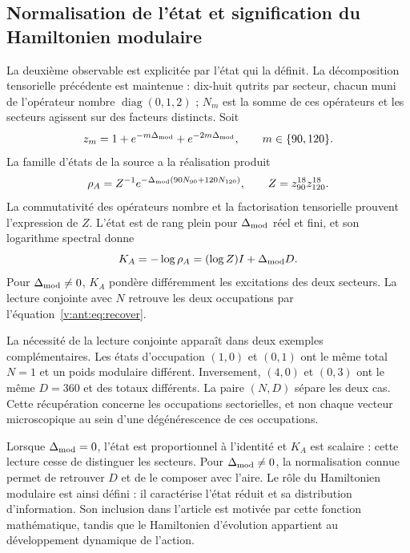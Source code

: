 \subsection{Normalisation de l'état et signification du Hamiltonien modulaire}
La deuxième observable est explicitée par l'état qui la définit.
La décomposition tensorielle précédente est maintenue : dix-huit qutrits
par secteur, chacun muni de l'opérateur nombre $\operatorname{diag}(0,1,2)$ ;
$N_m$ est la somme de ces opérateurs et les secteurs agissent sur des facteurs
distincts. Soit
\[
 z_m=1+e^{-m\Delta_{\rm mod}}+e^{-2m\Delta_{\rm mod}},
 \qquad m\in\{90,120\}.
\]
La famille d’états de la source a la réalisation produit
\[
 \rho_A=Z^{-1}e^{-\Delta_{\rm mod}(90N_{90}+120N_{120})},
 \qquad Z=z_{90}^{18}z_{120}^{18}.
\]
La commutativité des opérateurs nombre et la factorisation tensorielle
prouvent l'expression de $Z$. L'état est de rang plein pour
$\Delta_{\rm mod}$ réel et fini, et son logarithme spectral donne
\[
 K_A=-\log\rho_A=(\log Z)I+\Delta_{\rm mod}D.
\]
Pour $\Delta_{\rm mod}\ne0$, $K_A$ pondère différemment les excitations
des deux secteurs. La lecture conjointe avec $N$ retrouve les deux occupations
par l'équation~\eqref{v:ant:eq:recover}.

La nécessité de la lecture conjointe apparaît dans deux exemples complémentaires.
Les états d'occupation $(1,0)$ et $(0,1)$ ont le même total $N=1$
et un poids modulaire différent. Inversement, $(4,0)$ et $(0,3)$ ont
le même $D=360$ et des totaux différents. La paire $(N,D)$ sépare les deux
cas. Cette récupération concerne les occupations sectorielles, et non
chaque vecteur microscopique au sein d'une dégénérescence de ces occupations.

Lorsque $\Delta_{\rm mod}=0$, l'état est proportionnel à l'identité
et $K_A$ est scalaire : cette lecture cesse de distinguer les secteurs.
Pour $\Delta_{\rm mod}\ne0$, la normalisation connue permet de retrouver
$D$ et de le composer avec l'aire. Le rôle du Hamiltonien
modulaire est ainsi défini : il caractérise l'état réduit et sa distribution d'information.
Son inclusion dans l'article est motivée par cette fonction mathématique,
tandis que le Hamiltonien d'évolution appartient au développement dynamique
de l'action.
